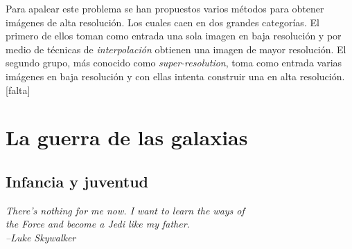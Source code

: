 \documentclass[11pt,a4paper,twoside]{tesis}
\begin{document}
Para apalear este problema se han propuestos varios m\'etodos para obtener im\'agenes de alta 
resoluci\'on. Los cuales caen en dos grandes categor\'ias. El primero de ellos toman como 
entrada una sola imagen en baja resoluci\'on y por medio de t\'ecnicas de 
\textit{interpolaci\'on} obtienen una imagen de mayor resoluci\'on. El segundo grupo, m\'as 
conocido como \textit{super-resolution}, toma como entrada varias im\'agenes en baja resoluci\'on y 
con ellas intenta construir una en alta resoluci\'on. [falta]



















\chapter{La guerra de las galaxias}
\section{Infancia y juventud}
{\begin{small}%
\begin{flushright}%
\it
There's nothing for me now.
I want to learn the ways of\\ the Force and become a Jedi like my father. \\
--Luke Skywalker
\end{flushright}%
\end{small}%
\vspace{.5cm}}
\end{document}
